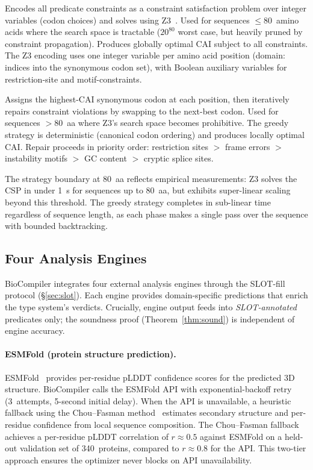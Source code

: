 \documentclass[acmsmall,review,anonymous]{acmart}
\begin{document}
\begin{description}[leftmargin=!,labelwidth=3.0cm,itemsep=2pt,topsep=2pt]
\item[Constraint-first (Z3 CSP):]
Encodes all predicate constraints as a constraint satisfaction problem
over integer variables (codon choices) and solves using
Z3~\cite{demoura2008z3}.  Used for sequences $\le 80$~amino acids where
the search space is tractable ($20^{80}$ worst case, but heavily
pruned by constraint propagation).  Produces globally optimal CAI
subject to all constraints.  The Z3 encoding uses one integer variable
per amino acid position (domain: indices into the synonymous codon
set), with Boolean auxiliary variables for restriction-site and
motif-constraints.

\item[CAI-first (greedy):]
Assigns the highest-CAI synonymous codon at each position, then
iteratively repairs constraint violations by swapping to the next-best
codon.  Used for sequences $> 80$~aa where Z3's search space becomes
prohibitive.  The greedy strategy is deterministic (canonical codon
ordering) and produces locally optimal CAI.  Repair proceeds in
priority order: restriction sites $>$ frame errors $>$ instability
motifs $>$ GC content $>$ cryptic splice sites.
\end{description}

The strategy boundary at 80~aa reflects empirical measurements: Z3
solves the CSP in under 1~s for sequences up to 80~aa, but exhibits
super-linear scaling beyond this threshold.  The greedy strategy
completes in sub-linear time regardless of sequence length, as each
phase makes a single pass over the sequence with bounded backtracking.

\subsection{Four Analysis Engines}\label{sec:engines}

BioCompiler integrates four external analysis engines through the SLOT-fill
protocol (\S\ref{sec:slot}).  Each engine provides domain-specific
predictions that enrich the type system's verdicts.  Crucially, engine
output feeds into \emph{SLOT-annotated} predicates only; the soundness
proof (Theorem~\ref{thm:sound}) is independent of engine accuracy.

\paragraph{ESMFold (protein structure prediction).}
ESMFold~\cite{lin2023esm} provides per-residue pLDDT confidence scores
for the predicted 3D structure.  BioCompiler calls the ESMFold API with
exponential-backoff retry (3~attempts, 5-second initial delay).  When the
API is unavailable, a heuristic fallback using the Chou--Fasman
method~\cite{chou1974prediction} estimates secondary structure and
per-residue confidence from local sequence composition.  The Chou--Fasman
fallback achieves a per-residue pLDDT correlation of $r \approx 0.5$
against ESMFold on a held-out validation set of 340~proteins, compared to
$r \approx 0.8$ for the API.  This two-tier approach ensures the
optimizer never blocks on API unavailability.
\end{document}
